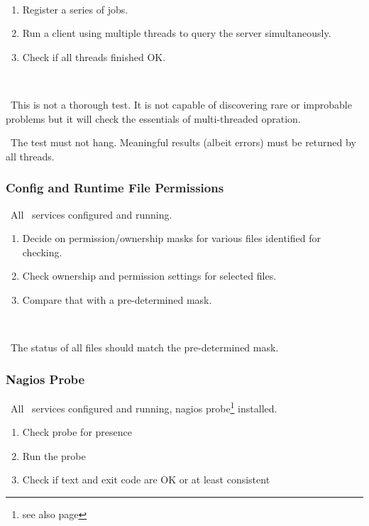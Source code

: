 \what\
\begin{enumerate}
\item Register a series of jobs.
\item Run a client using multiple threads to query the server simultaneously.
\item Check if all threads finished OK.
\end{enumerate}

\how\ 

\note\ This is not a thorough test. It is not capable of discovering rare or improbable problems but it will check the essentials of multi-threaded opration.

\result\ The test must not hang. Meaningful results (albeit errors) must be returned by all threads.

\subsubsection{Config and Runtime File Permissions}
\label{permissions}
\req\ All \LB\ services configured and running.

\what
\begin{enumerate}
\item Decide on permission/ownership masks for various files identified for checking.
\item Check ownership and permission settings for selected files.
\item Compare that with a pre-determined mask.
\end{enumerate}

\how\ 

\result\ The status of all files should match the pre-determined mask.


\subsubsection{Nagios Probe}
\label{permissions}
\req\ All \LB\ services configured and running, nagios probe\footnote{see also page \pageref{s:nagios}} installed.

\what
\begin{enumerate}
\item Check probe for presence
\item Run the probe
\item Check if text and exit code are OK or at least consistent
\end{enumerate}


